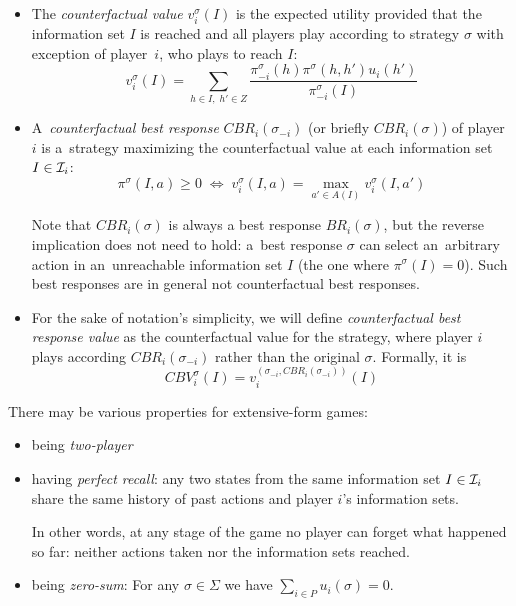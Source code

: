\begin{itemize}
  \item The \emph{counterfactual value} $v _i ^\sigma (I)$ is the expected utility provided that the information set $I$ is reached and all players play according to strategy $\sigma$ with exception of player~$i$, who plays to reach $I$:
    \[ v _i ^\sigma (I) = \sum\limits _{h \in I, \; h' \in Z}
      \frac
      {\pi _{-i} ^\sigma(h) \pi ^\sigma(h,h') u_i(h')}
      {\pi _{-i} ^\sigma (I)} \]

  \item A~\emph{counterfactual best response} $CBR _i (\sigma _{-i})$ (or briefly $CBR _i (\sigma)$) of player~$i$ is a~strategy maximizing the counterfactual value at each information set $I \in \mathcal{I} _i$:
    \[ \pi ^\sigma (I, a) \geq 0
      \; \Longleftrightarrow \;
      v _i ^\sigma (I, a) = \max _{a' \in A(I)} v _i ^\sigma (I, a') \]

    Note that $CBR _i (\sigma)$ is always a best response $BR _i (\sigma)$, but the reverse implication does not need to hold:
    a~best response $\sigma$ can select an~arbitrary action in an~unreachable information set $I$ (the one where $\pi ^\sigma (I) = 0$).
    Such best responses are in general not counterfactual best responses.

  \item For the sake of notation's simplicity, we will define \emph{counterfactual best response value} as the counterfactual value for the strategy, where player $i$ plays according $CBR _i (\sigma _{-i})$ rather than the original $\sigma$.
    Formally, it is
    \[ CBV _i ^\sigma (I) = v _i ^{(\sigma _{-i}, CBR _i (\sigma _{-i} ))} (I) \]

\end{itemize}

There may be various properties for extensive-form games:

\begin{itemize}
  \item being \emph{two-player}
  \item having \emph{perfect recall}: any two states from the same information set $I \in \mathcal{I} _i$ share the same history of past actions and player $i$'s information sets.

    In other words, at any stage of the game no player can forget what happened so far:
    neither actions taken nor the information sets reached.
  \item being \emph{zero-sum}: For any $\sigma \in \Sigma$ we have $\sum _{i \in P} u _i (\sigma) = 0$.
\end{itemize}

